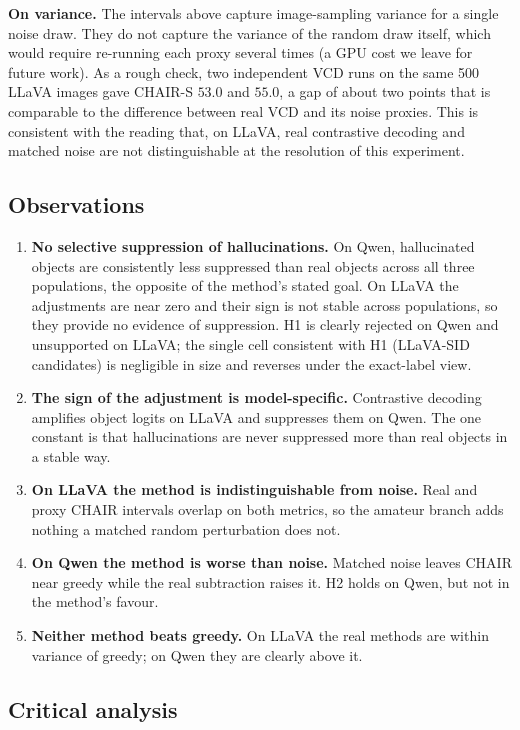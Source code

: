 \documentclass{article}
\begin{document}
\textbf{On variance.} The intervals above capture image-sampling variance for a
single noise draw. They do not capture the variance of the random draw itself,
which would require re-running each proxy several times (a GPU cost we leave for
future work). As a rough check, two independent VCD runs on the same 500 LLaVA
images gave CHAIR-S $53.0$ and $55.0$, a gap of about two points that is
comparable to the difference between real VCD and its noise proxies. This is
consistent with the reading that, on LLaVA, real contrastive decoding and matched
noise are not distinguishable at the resolution of this experiment.

\subsection{Observations}
\label{subsec:dproxy-obs}

\begin{enumerate}
  \item \textbf{No selective suppression of hallucinations.} On Qwen,
  hallucinated objects are consistently less suppressed than real objects across
  all three populations, the opposite of the method's stated goal. On LLaVA the
  adjustments are near zero and their sign is not stable across populations, so
  they provide no evidence of suppression. H1 is clearly rejected on Qwen and
  unsupported on LLaVA; the single cell consistent with H1 (LLaVA-SID candidates)
  is negligible in size and reverses under the exact-label view.
  \item \textbf{The sign of the adjustment is model-specific.} Contrastive
  decoding amplifies object logits on LLaVA and suppresses them on Qwen. The one
  constant is that hallucinations are never suppressed more than real objects in a
  stable way.
  \item \textbf{On LLaVA the method is indistinguishable from noise.} Real and
  proxy CHAIR intervals overlap on both metrics, so the amateur branch adds
  nothing a matched random perturbation does not.
  \item \textbf{On Qwen the method is worse than noise.} Matched noise leaves
  CHAIR near greedy while the real subtraction raises it. H2 holds on Qwen, but
  not in the method's favour.
  \item \textbf{Neither method beats greedy.} On LLaVA the real methods are within
  variance of greedy; on Qwen they are clearly above it.
\end{enumerate}

\subsection{Critical analysis}
\label{subsec:dproxy-critique}
\end{document}
